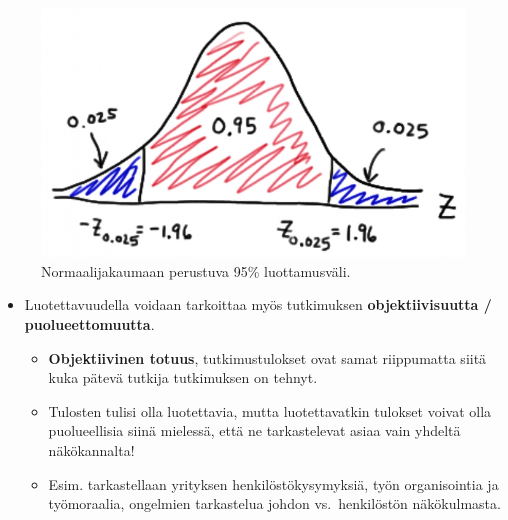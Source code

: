 \documentclass[
]{book}
\providecommand{\tightlist}{%
  \setlength{\itemsep}{0pt}\setlength{\parskip}{0pt}}
\begin{document}
\begin{figure}

{\centering \includegraphics[width=0.75\linewidth]{images/luottamus} 

}

\caption{Normaalijakaumaan perustuva 95\% luottamusväli.}\label{fig:luottamus}
\end{figure}

\begin{itemize}
\tightlist
\item
  Luotettavuudella voidaan tarkoittaa myös tutkimuksen \textbf{objektiivisuutta / puolueettomuutta}.

  \begin{itemize}
  \tightlist
  \item
    \textbf{Objektiivinen totuus}, tutkimustulokset ovat samat riippumatta siitä kuka pätevä tutkija tutkimuksen on tehnyt.
  \item
    Tulosten tulisi olla luotettavia, mutta luotettavatkin tulokset voivat olla puolueellisia siinä mielessä, että ne tarkastelevat asiaa vain yhdeltä näkökannalta!
  \item
    Esim. tarkastellaan yrityksen henkilöstökysymyksiä, työn organisointia ja työmoraalia, ongelmien tarkastelua johdon vs.~henkilöstön näkökulmasta.
  \end{itemize}
\end{itemize}
\end{document}
